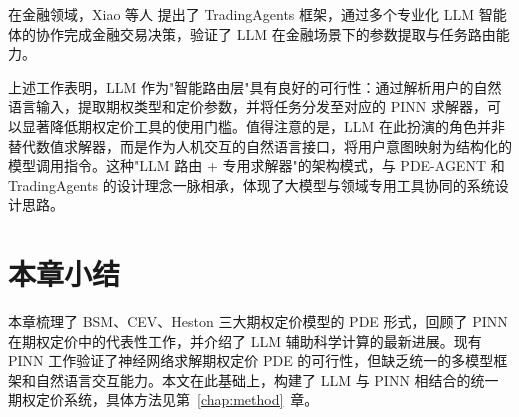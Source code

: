 在金融领域，Xiao 等人\citep{xiao2024tradingagents} 提出了 TradingAgents 框架，通过多个专业化 LLM 智能体的协作完成金融交易决策，验证了 LLM 在金融场景下的参数提取与任务路由能力。

上述工作表明，LLM 作为"智能路由层"具有良好的可行性：通过解析用户的自然语言输入，提取期权类型和定价参数，并将任务分发至对应的 PINN 求解器，可以显著降低期权定价工具的使用门槛。值得注意的是，LLM 在此扮演的角色并非替代数值求解器，而是作为人机交互的自然语言接口，将用户意图映射为结构化的模型调用指令。这种"LLM 路由 + 专用求解器"的架构模式，与 PDE-AGENT\citep{liu2025pdeagent} 和 TradingAgents\citep{xiao2024tradingagents} 的设计理念一脉相承，体现了大模型与领域专用工具协同的系统设计思路。

\section{本章小结}\label{sec:related_summary}

本章梳理了 BSM、CEV、Heston 三大期权定价模型的 PDE 形式，回顾了 PINN 在期权定价中的代表性工作，并介绍了 LLM 辅助科学计算的最新进展。现有 PINN 工作验证了神经网络求解期权定价 PDE 的可行性，但缺乏统一的多模型框架和自然语言交互能力。本文在此基础上，构建了 LLM 与 PINN 相结合的统一期权定价系统，具体方法见第~\ref{chap:method}~章。
